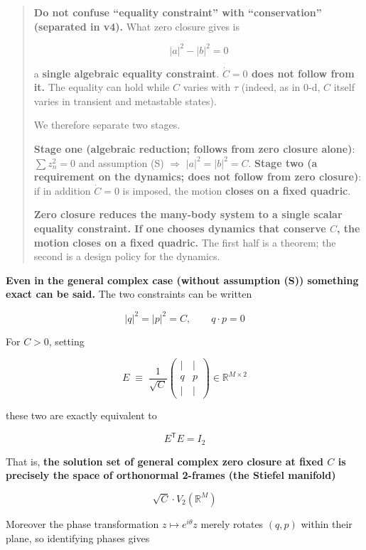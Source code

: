 \documentclass[
  10pt,
]{article}
\begin{document}
\begin{quote}
\textbf{Do not confuse ``equality constraint'' with ``conservation''
(separated in v4).} What zero closure gives is

\[\lvert a\rvert^2 - \lvert b\rvert^2 = 0\]

a \textbf{single algebraic equality constraint}. \textbf{\(\dot C = 0\)
does not follow from it.} The equality can hold while \(C\) varies with
\(\tau\) (indeed, as in 0-d, \(C\) itself varies in transient and
metastable states).

We therefore separate two stages.

\textbf{Stage one (algebraic reduction; follows from zero closure
alone)}: \(\sum z_n^2 = 0\) and assumption (S) \(\Rightarrow\)
\(\lvert a\rvert^2 = \lvert b\rvert^2 = C\). \textbf{Stage two (a
requirement on the dynamics; does not follow from zero closure)}: if in
addition \(\dot C = 0\) is imposed, the motion \textbf{closes on a fixed
quadric}.

\textbf{Zero closure reduces the many-body system to a single scalar
equality constraint. If one chooses dynamics that conserve \(C\), the
motion closes on a fixed quadric.} The first half is a theorem; the
second is a design policy for the dynamics.
\end{quote}

\textbf{Even in the general complex case (without assumption (S))
something exact can be said.} The two constraints can be written

\[\lvert q\rvert^2 = \lvert p\rvert^2 = C, \qquad q\cdot p = 0\]

For \(C > 0\), setting

\[E \;\equiv\; \frac{1}{\sqrt{C}}\begin{pmatrix} | & | \\ q & p \\ | & | \end{pmatrix} \in \mathbb{R}^{M\times 2}\]

these two are exactly equivalent to

\[\boxed{\;E^{\mathsf T}E = I_2\;}\]

That is, \textbf{the solution set of general complex zero closure at
fixed \(C\) is precisely the space of orthonormal 2-frames (the Stiefel
manifold)}

\[\sqrt{C}\cdot V_2(\mathbb{R}^M)\]

Moreover the phase transformation \(z \mapsto e^{i\theta}z\) merely
rotates \((q,p)\) within their plane, so identifying phases gives
\end{document}
